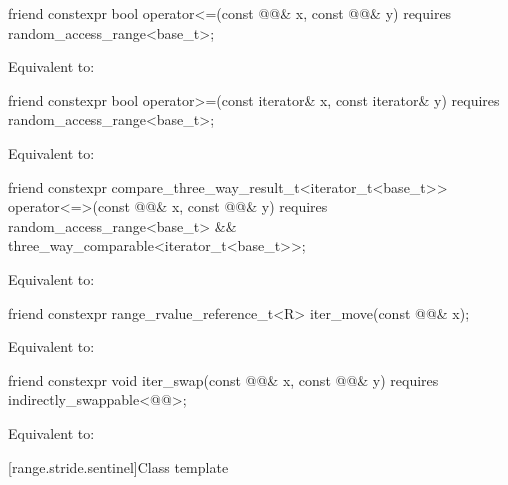\begin{itemdecl}
friend constexpr bool operator<=(const @@& x, const @@& y)
  requires random_access_range<base_t>;
\end{itemdecl}
\begin{itemdescr}
	\pnum
	\effects Equivalent to: 
\end{itemdescr}

\begin{itemdecl}
friend constexpr bool operator>=(const iterator& x, const iterator& y)
  requires random_access_range<base_t>;
\end{itemdecl}
\begin{itemdescr}
	\pnum
	\effects Equivalent to: 
\end{itemdescr}

\begin{itemdecl}
friend constexpr compare_three_way_result_t<iterator_t<base_t>>
  operator<=>(const @@& x, const @@& y)
    requires random_access_range<base_t> && three_way_comparable<iterator_t<base_t>>;
\end{itemdecl}
\begin{itemdescr}
	\pnum
	\effects Equivalent to: 
\end{itemdescr}

\begin{itemdecl}
friend constexpr range_rvalue_reference_t<R> iter_move(const @@& x);
\end{itemdecl}
\begin{itemdescr}
	\pnum
	\effects Equivalent to: 
\end{itemdescr}

\begin{itemdecl}
friend constexpr void iter_swap(const @@& x, const @@& y)
  requires indirectly_swappable<@@>;
\end{itemdecl}
\begin{itemdescr}
	\pnum
	\effects Equivalent to: 
\end{itemdescr}

[range.stride.sentinel]{Class template }

